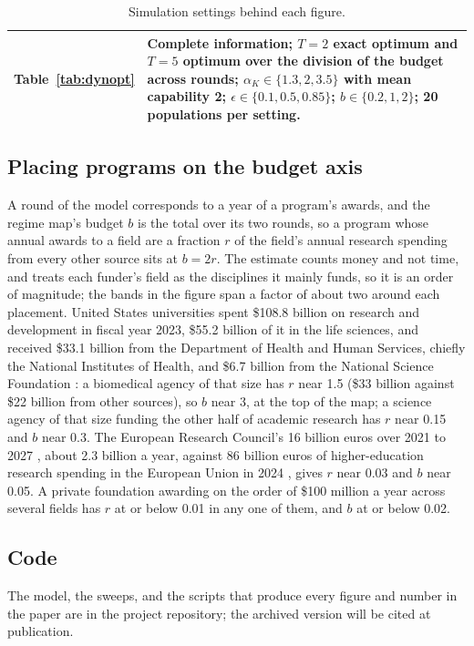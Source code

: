 \begin{table}[tp]
\begin{tabular}{@{}p{2.3cm}p{10.0cm}@{}}
Table~\ref{tab:dynopt} & Complete information; $T = 2$ exact optimum and $T = 5$ optimum over the division of the budget across rounds; $\alpha_K \in \{1.3, 2, 3.5\}$ with mean capability 2; $\epsilon \in \{0.1, 0.5, 0.85\}$; $b \in \{0.2, 1, 2\}$; 20 populations per setting. \\
\bottomrule
\end{tabular}
\caption{Simulation settings behind each figure.}
\label{tab:settings}
\end{table}

\subsection*{Placing programs on the budget axis}
A round of the model corresponds to a year of a program's awards, and the regime map's budget $b$ is the total over its two rounds, so a program whose annual awards to a field are a fraction $r$ of the field's annual research spending from every other source sits at $b = 2r$. The estimate counts money and not time, and treats each funder's field as the disciplines it mainly funds, so it is an order of magnitude; the bands in the figure span a factor of about two around each placement. United States universities spent \$108.8 billion on research and development in fiscal year 2023, \$55.2 billion of it in the life sciences, and received \$33.1 billion from the Department of Health and Human Services, chiefly the National Institutes of Health, and \$6.7 billion from the National Science Foundation \citep{NCSES2025HERD}: a biomedical agency of that size has $r$ near 1.5 (\$33 billion against \$22 billion from other sources), so $b$ near 3, at the top of the map; a science agency of that size funding the other half of academic research has $r$ near 0.15 and $b$ near 0.3. The European Research Council's 16 billion euros over 2021 to 2027 \citep{ERC2025}, about 2.3 billion a year, against 86 billion euros of higher-education research spending in the European Union in 2024 \citep{Eurostat2025}, gives $r$ near 0.03 and $b$ near 0.05. A private foundation awarding on the order of \$100 million a year across several fields has $r$ at or below 0.01 in any one of them, and $b$ at or below 0.02.

\subsection*{Code}
The model, the sweeps, and the scripts that produce every figure and number in the paper are in the project repository; the archived version will be cited at publication. %
